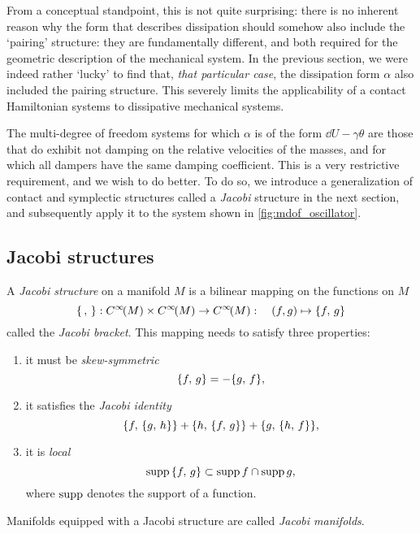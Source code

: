 From a conceptual standpoint, this is not quite surprising: there is no inherent reason why the form that describes dissipation should somehow also include the `pairing' structure: they are fundamentally different, and both required for the geometric description of the mechanical system. In the previous section, we were indeed rather `lucky' to find that, \emph{that particular case}, the dissipation form \(\alpha\) also included the pairing structure. This severely limits the applicability of a contact Hamiltonian systems to dissipative mechanical systems.

The multi-degree of freedom systems for which \( \alpha \) is of the form \(\dd{U} - \gamma \theta\) are those that do exhibit not damping on the relative velocities of the masses, and for which all dampers have the same damping coefficient. This is a very restrictive requirement, and we wish to do better. To do so, we introduce a generalization of contact and symplectic structures called a \emph{Jacobi} structure in the next section, and subsequently apply it to the system shown in \cref{fig:mdof_oscillator}.

\subsection{Jacobi structures}
A \emph{Jacobi structure} on a manifold \(M\) is a bilinear mapping on the functions on \(M\) \cite{marle1991}
\begin{equation}
     \{\,,\,\}: C^\infty\!\qty(M)\times C^\infty\!\qty(M) \to C^\infty\!\qty(M): \quad (f, g) \mapsto \{f,\,g\}
\end{equation}
called the \emph{Jacobi bracket}. This mapping needs to satisfy three properties:
\begin{enumerate}[label=(\roman*), noitemsep]
    \item it must be \emph{skew-symmetric}
        \begin{equation}
     \{f,\,g\} = -\{g,\,f\},
\end{equation}
    \item it satisfies the \emph{Jacobi identity}
        \begin{equation}
     \{f,\,\{g,\,h\}\} + \{h,\,\{f,\,g\}\} + \{g,\,\{h,\,f\}\},
\end{equation}
    \item it is \emph{local}
        \begin{equation}
     \operatorname{supp}{\{f,\,g\}} \subset \operatorname{supp}{f} \cap \operatorname{supp}{g},
\end{equation}
        where \(\operatorname{supp}\) denotes the support of a function.
\end{enumerate}
Manifolds equipped with a Jacobi structure are called \emph{Jacobi manifolds}.

